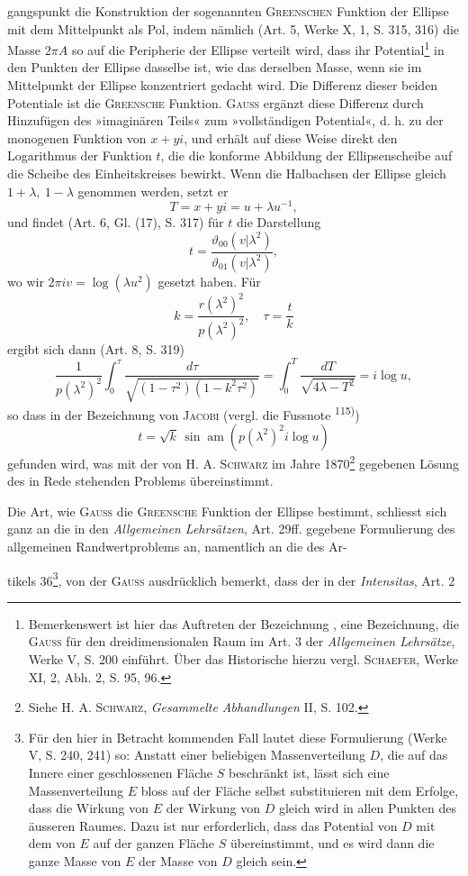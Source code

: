 \clearpage{}
\noindent gangspunkt die Konstruktion der sogenannten \textsc{Greenschen} Funktion der Ellipse
mit dem Mittelpunkt als Pol, indem nämlich (Art. 5, Werke X, 1, S. 315,
316) die Masse \(2\pi A\) so auf die Peripherie der Ellipse verteilt wird, dass ihr
Potential\footnote{Bemerkenswert ist hier das Auftreten der Bezeichnung , eine Bezeichnung, die \textsc{Gauss} für den dreidimensionalen Raum im Art. 3 der \textit{Allgemeinen Lehrsätze}, Werke V, S. 200 einführt. Über das Historische hierzu vergl. \textsc{Schaefer}, Werke XI, 2, Abh. 2, S. 95, 96.} in den Punkten der Ellipse dasselbe ist, wie das derselben Masse,
wenn sie im Mittelpunkt der Ellipse konzentriert gedacht wird. Die Differenz
dieser beiden Potentiale ist die \textsc{Greensche} Funktion. \textsc{Gauss} ergänzt
diese Differenz durch Hinzufügen des »imaginären Teils« zum »vollständigen
Potential«, d. h. zu der monogenen Funktion von \(x+yi\), und erhält auf
diese Weise direkt den Logarithmus der Funktion \(t\), die die konforme Abbildung
der Ellipsenscheibe auf die Scheibe des Einheitskreises bewirkt. Wenn
die Halbachsen der Ellipse gleich \(1+\lambda,\ 1-\lambda\) genommen werden, setzt er
\[
T=x+yi=u+\lambda u^{-1},
\]
und findet (Art. 6, Gl. (17), S. 317) für \(t\) die Darstellung
\[
t=\frac{\vartheta_{00}(v|\lambda^2)}{\vartheta_{01}(v|\lambda^2)},
\]
wo wir \(2\pi iv=\log(\lambda u^2)\) gesetzt haben. Für
\[
k=\frac{r(\lambda^2)^2}{p(\lambda^2)^2},\quad \tau=\frac tk
\]
ergibt sich dann (Art. 8, S. 319)
\[
\frac1{p(\lambda^2)^2}\int_0^\tau\frac{d\tau}{\sqrt{(1-\tau^2)(1-k^2\tau^2)}}
=\int_0^T\frac{dT}{\sqrt{4\lambda-T^2}}=i\log u,
\]
so dass in der Bezeichnung von \textsc{Jacobi} (vergl. die Fussnote \textsuperscript{115)})
\[
t=\sqrt{k}\,\sin\operatorname{am}(p(\lambda^2)^2i\log u)
\]
gefunden wird, was mit der von \textsc{H. A. Schwarz} im Jahre 1870\footnote{Siehe \textsc{H. A. Schwarz}, \textit{Gesammelte Abhandlungen} II, S. 102.} gegebenen
Lösung des in Rede stehenden Problems übereinstimmt.
\par
Die Art, wie \textsc{Gauss} die \textsc{Greensche} Funktion der Ellipse bestimmt, schliesst
sich ganz an die in den \textit{Allgemeinen Lehrsätzen}, Art. 29ff. gegebene Formulierung
des allgemeinen Randwertproblems an, namentlich an die des Ar-\par
{}
\clearpage{}
\noindent tikels 36\footnote{Für den hier in Betracht kommenden Fall lautet diese Formulierung (Werke V, S. 240, 241) so: Anstatt einer beliebigen Massenverteilung \(D\), die auf das Innere einer geschlossenen Fläche \(S\) beschränkt ist, lässt sich eine Massenverteilung \(E\) bloss auf der Fläche selbst substituieren mit dem Erfolge, dass die Wirkung von \(E\) der Wirkung von \(D\) gleich wird in allen Punkten des äusseren Raumes. Dazu ist nur erforderlich, dass das Potential von \(D\) mit dem von \(E\) auf der ganzen Fläche \(S\) übereinstimmt, und es wird dann die ganze Masse von \(E\) der Masse von \(D\) gleich sein.}, von der \textsc{Gauss} ausdrücklich bemerkt, dass der in der \textit{Intensitas}, Art. 2
